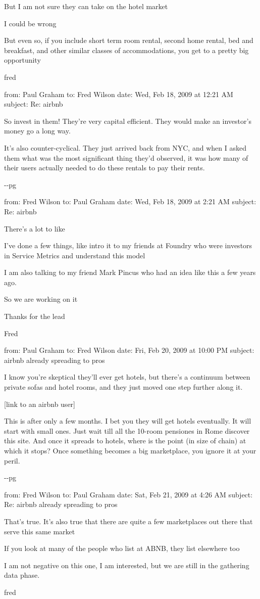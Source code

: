 But I am not sure they can take on the hotel market

I could be wrong

But even so, if you include short term room rental, second home rental,
bed and breakfast, and other similar classes of accommodations, you get
to a pretty big opportunity

fred

from: Paul Graham to: Fred Wilson date: Wed, Feb 18, 2009 at 12:21 AM
subject: Re: airbnb

So invest in them! They're very capital efficient. They would make an
investor's money go a long way.

It's also counter-cyclical. They just arrived back from NYC, and when I
asked them what was the most significant thing they'd observed, it was
how many of their users actually needed to do these rentals to pay their
rents.

-\/-pg

from: Fred Wilson to: Paul Graham date: Wed, Feb 18, 2009 at 2:21 AM
subject: Re: airbnb

There's a lot to like

I've done a few things, like intro it to my friends at Foundry who were
investors in Service Metrics and understand this model

I am also talking to my friend Mark Pincus who had an idea like this a
few years ago.

So we are working on it

Thanks for the lead

Fred

from: Paul Graham to: Fred Wilson date: Fri, Feb 20, 2009 at 10:00 PM
subject: airbnb already spreading to pros

I know you're skeptical they'll ever get hotels, but there's a continuum
between private sofas and hotel rooms, and they just moved one step
further along it.

{[}link to an airbnb user{]}

This is after only a few months. I bet you they will get hotels
eventually. It will start with small ones. Just wait till all the
10-room pensiones in Rome discover this site. And once it spreads to
hotels, where is the point (in size of chain) at which it stops? Once
something becomes a big marketplace, you ignore it at your peril.

-\/-pg

from: Fred Wilson to: Paul Graham date: Sat, Feb 21, 2009 at 4:26 AM
subject: Re: airbnb already spreading to pros

That's true. It's also true that there are quite a few marketplaces out
there that serve this same market

If you look at many of the people who list at ABNB, they list elsewhere
too

I am not negative on this one, I am interested, but we are still in the
gathering data phase.

fred